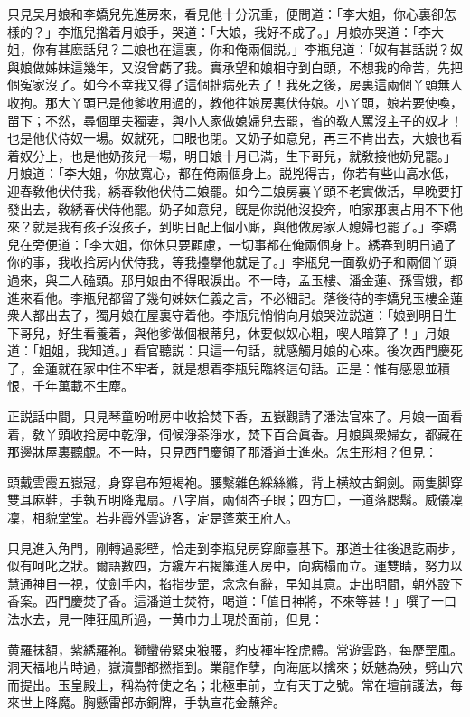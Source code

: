 只見吴月娘和李嬌兒先進房來，看見他十分沉重，便問道：「李大姐，你心裏卻怎樣的？」李瓶兒揝着月娘手，哭道：「大娘，我好不成了。」月娘亦哭道：「李大姐，你有甚麽話兒？二娘也在這裏，你和俺兩個説。」李瓶兒道：「奴有甚話説？奴與娘做姊妹這幾年，又沒曾虧了我。實承望和娘相守到白頭，不想我的命苦，先把個寃家沒了。如今不幸我又得了這個拙病死去了！我死之後，房裏這兩個丫頭無人收拘。那大丫頭已是他爹收用過的，教他往娘房裏伏侍娘。小丫頭，娘若要使喚，㽞下；不然，尋個單夫獨妻，與小人家做媳婦兒去罷，省的敎人罵沒主子的奴才！也是他伏侍奴一場。奴就死，口眼也閉。又奶子如意兒，再三不肯出去，大娘也看着奴分上，也是他奶孩兒一場，明日娘十月已滿，生下哥兒，就敎接他奶兒罷。」月娘道：「李大姐，你放寬心，都在俺兩個身上。説兇得吉，你若有些山高水低，迎春敎他伏侍我，綉春敎他伏侍二娘罷。如今二娘房裏丫頭不老實做活，早晚要打發出去，敎綉春伏侍他罷。奶子如意兒，旣是你説他沒投奔，咱家那裏占用不下他來？就是我有孩子沒孩子，到明日配上個小廝，與他做房家人媳婦也罷了。」李嬌兒在旁便道：「李大姐，你休只要顧慮，一切事都在俺兩個身上。綉春到明日過了你的事，我收拾房内伏侍我，等我擡擧他就是了。」李瓶兒一面敎奶子和兩個丫頭過來，與二人磕頭。那月娘由不得眼淚出。不一時，孟玉樓、潘金蓮、孫雪娥，都進來看他。李瓶兒都留了幾句姊妹仁義之言，不必細記。落後待的李嬌兒玉樓金蓮衆人都出去了，獨月娘在屋裏守着他。李瓶兒悄悄向月娘哭泣説道：「娘到明日生下哥兒，好生看養着，與他爹做個根蒂兒，休要似奴心粗，喫人暗算了！」月娘道：「姐姐，我知道。」看官聽説：只這一句話，就感觸月娘的心來。後次西門慶死了，金蓮就在家中住不牢者，就是想着李瓶兒臨終這句話。正是：惟有感恩並積恨，千年萬載不生塵。

正説話中間，只見琴童吩咐房中收拾焚下香，五嶽觀請了潘法官來了。月娘一面看着，敎丫頭收拾房中乾淨，伺候淨茶淨水，焚下百合眞香。月娘與衆婦女，都藏在那邊牀屋裏聽覷。不一時，只見西門慶領了那潘道士進來。怎生形相？但見：

頭戴雲霞五嶽冠，身穿皂布短褐袍。腰繫雜色綵絲縧，背上横紋古銅劍。兩隻脚穿雙耳麻鞋，手執五明降鬼扇。八字眉，兩個杏子眼；四方口，一道落腮鬍。威儀凜凜，相貌堂堂。若非霞外雲遊客，定是蓬萊王府人。

只見進入角門，剛轉過影壁，恰走到李瓶兒房穿廊臺基下。那道士往後退訖兩步，似有呵叱之狀。爾語數四，方纔左右揭簾進入房中，向病榻而立。運雙睛，努力以慧通神目一視，仗劍手内，掐指步罡，念念有辭，早知其意。走出明間，朝外設下香案。西門慶焚了香。這潘道士焚符，喝道：「值日神將，不來等甚！」噀了一口法水去，見一陣狂風所過，一黄巾力士現於面前，但見：

黄羅抹額，紫綉羅袍。獅蠻帶緊束狼腰，豹皮褌牢拴虎體。常遊雲路，每歷罡風。洞天福地片時過，嶽瀆酆都撚指到。業龍作孽，向海底以擒來；妖魅為殃，劈山穴而提出。玉皇殿上，稱為符使之名；北極車前，立有天丁之號。常在壇前護法，每來世上降魔。胸懸雷部赤銅牌，手執宣花金蘸斧。

